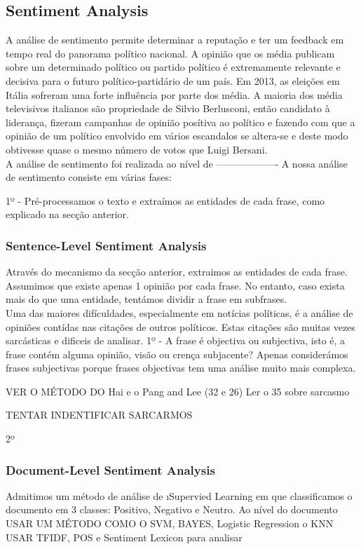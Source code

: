 \subsection{Sentiment Analysis}
\label{sec:sentiment_analysis}
A análise de sentimento permite determinar a reputação e ter um feedback em tempo real do panorama político nacional. A opinião que os média publicam sobre um determinado político ou partido político é extremamente relevante e decisiva para o futuro político-partidário de um país. Em 2013, as eleições em Itália sofreram uma forte influência por parte dos média. A maioria dos média televisivos italianos são propriedade de Silvio Berlusconi, então candidato à liderança, fizeram campanhas de opinião posítiva ao político e fazendo com que a opinião de um político envolvido em vários escandalos se altera-se e deste modo obtivesse quase o mesmo número de votos que Luigi Bersani.\\
A análise de sentimento foi realizada ao nível de -------------------
A nossa análise de sentimento consiste em várias fases:

1º - Pré-processamos o texto e extraímos as entidades de cada frase, como explicado na secção anterior. 


\subsubsection{Sentence-Level Sentiment Analysis}
Através do mecanismo da secção anterior, extraimos as entidades de cada frase. Assumimos que existe apenas 1 opinião por cada frase. No entanto, caso exista mais do que uma entidade, tentámos dividir a frase em subfrases. \\
Uma das maiores difículdades, especialmente em notícias políticas, é a análise de opiniões contídas nas citações de outros políticos. Estas citações são muitas vezes sarcásticas e dificeis de analisar. 
1º - A frase é objectiva ou subjectiva, isto é, a frase contém alguma opinião, visão ou crença subjacente? Apenas considerámos frases subjectivas porque frases objectivas tem uma análise muito mais complexa. 

VER O MÉTODO DO Hai e o Pang and Lee (32 e 26) Ler o 35 sobre sarcasmo

TENTAR INDENTIFICAR SARCARMOS


2º 

\subsubsection{Document-Level Sentiment Analysis}
Admitimos um método de análise de \i{Supervied Learning} em que classificamos o documento em 3 classes: Positivo, Negativo e Neutro. 
Ao nível do documento
USAR UM MÉTODO COMO O SVM, BAYES, Logistic Regression o KNN
USAR TFIDF, POS e Sentiment Lexicon para analisar 



